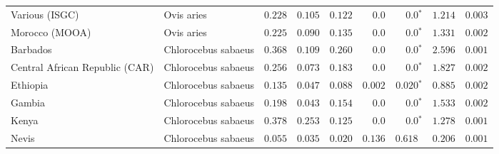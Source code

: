 \begin{center}
\begin{adjustbox}{width = 1\textwidth}
\begin{tabular}{|l|l|r|r|r|r|r|r|r|}
                 Various (ISGC) &           Ovis aries &                                        $ 0.228$ &                                           $ 0.105$ &                      $ 0.122$ &            $0.0$ &                  $\bm{0.0{^*}}$ &                                           $ 1.214$ &           $ 0.003$ \\
                 Morocco (MOOA) &           Ovis aries &                                        $ 0.225$ &                                           $ 0.090$ &                      $ 0.135$ &            $0.0$ &                  $\bm{0.0{^*}}$ &                                           $ 1.331$ &           $ 0.002$ \\
                       Barbados &  Chlorocebus sabaeus &                                        $ 0.368$ &                                           $ 0.109$ &                      $ 0.260$ &            $0.0$ &                  $\bm{0.0{^*}}$ &                                           $ 2.596$ &           $ 0.001$ \\
 Central African Republic (CAR) &  Chlorocebus sabaeus &                                        $ 0.256$ &                                           $ 0.073$ &                      $ 0.183$ &            $0.0$ &                  $\bm{0.0{^*}}$ &                                           $ 1.827$ &           $ 0.002$ \\
                       Ethiopia &  Chlorocebus sabaeus &                                        $ 0.135$ &                                           $ 0.047$ &                      $ 0.088$ &         $ 0.002$ &               $\bm{ 0.020{^*}}$ &                                           $ 0.885$ &           $ 0.002$ \\
                         Gambia &  Chlorocebus sabaeus &                                        $ 0.198$ &                                           $ 0.043$ &                      $ 0.154$ &            $0.0$ &                  $\bm{0.0{^*}}$ &                                           $ 1.533$ &           $ 0.002$ \\
                          Kenya &  Chlorocebus sabaeus &                                        $ 0.378$ &                                           $ 0.253$ &                      $ 0.125$ &            $0.0$ &                  $\bm{0.0{^*}}$ &                                           $ 1.278$ &           $ 0.001$ \\
                          Nevis &  Chlorocebus sabaeus &                                        $ 0.055$ &                                           $ 0.035$ &                      $ 0.020$ &         $ 0.136$ &                      $ 0.618~~$ &                                           $ 0.206$ &           $ 0.001$ \\

\end{tabular}
\end{adjustbox}
\end{center}

